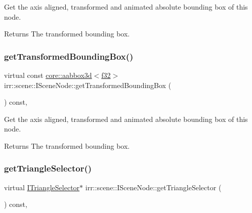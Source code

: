 Get the axis aligned, transformed and animated absolute bounding box of this node. 

\begin{DoxyReturn}{Returns}
The transformed bounding box. 
\end{DoxyReturn}
\mbox{\label{classirr_1_1scene_1_1ISceneNode_a77746edcc479107067fbf1f4471ab412}} 
\subsubsection{\texorpdfstring{get\+Transformed\+Bounding\+Box()}{getTransformedBoundingBox()}\hspace{0.1cm}{\footnotesize\ttfamily [2/2]}}
{\footnotesize\ttfamily virtual const \hyperlink{classirr_1_1core_1_1aabbox3d}{core\+::aabbox3d}$<$\hyperlink{namespaceirr_a0277be98d67dc26ff93b1a6a1d086b07}{f32}$>$ irr\+::scene\+::\+I\+Scene\+Node\+::get\+Transformed\+Bounding\+Box (\begin{DoxyParamCaption}{ }\end{DoxyParamCaption}) const\hspace{0.3cm}{\ttfamily [inline]}, {\ttfamily [virtual]}}



Get the axis aligned, transformed and animated absolute bounding box of this node. 

\begin{DoxyReturn}{Returns}
The transformed bounding box. 
\end{DoxyReturn}
\mbox{\label{classirr_1_1scene_1_1ISceneNode_ab820f7ccfdd317d3913316b6991ea5d9}} 
\subsubsection{\texorpdfstring{get\+Triangle\+Selector()}{getTriangleSelector()}\hspace{0.1cm}{\footnotesize\ttfamily [1/2]}}
{\footnotesize\ttfamily virtual \hyperlink{classirr_1_1scene_1_1ITriangleSelector}{I\+Triangle\+Selector}$\ast$ irr\+::scene\+::\+I\+Scene\+Node\+::get\+Triangle\+Selector (\begin{DoxyParamCaption}{ }\end{DoxyParamCaption}) const\hspace{0.3cm}{\ttfamily [inline]}, {\ttfamily [virtual]}}



